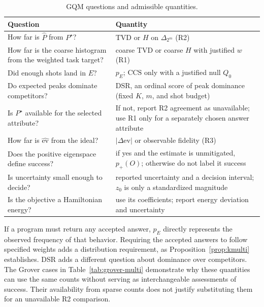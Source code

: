 \documentclass[10pt,conference]{IEEEtran}
\newcommand{\CCS}{\mathrm{CCS}}
\begin{document}
\begin{table}[ht]
\centering
\caption{GQM questions and admissible quantities.}
\label{tab:gqm}
\renewcommand{\arraystretch}{1.12}
\begin{tabularx}{\columnwidth}{@{}>{\raggedright\arraybackslash}X
>{\raggedright\arraybackslash}X@{}}
\toprule
\textbf{Question} & \textbf{Quantity} \\
\midrule
How far is $\hat{P}$ from $P^{\star}$? & TVD or $H$ on $\Delta_{2^{m}}$ (R2) \\
How far is the coarse histogram from the weighted task target? & coarse TVD or coarse $H$ with justified $w$ (R1) \\
Did enough shots land in $E$? & $p_{E}$; $\CCS$ only with a justified null $Q_0$ \\
Do expected peaks dominate competitors? & DSR, an ordinal score of peak dominance (fixed $K$, $m$, and shot budget) \\
Is $P^{\star}$ available for the selected attribute? & If not, report R2 agreement as unavailable; use R1 only for a separately chosen answer attribute \\
How far is $\widehat{\mathrm{ev}}$ from the ideal? & $\lvert\Delta\mathrm{ev}\rvert$ or observable fidelity (R3) \\
Does the positive eigenspace define success? & if yes and the estimate is unmitigated, $p_+(O)$; otherwise do not label it success \\
Is uncertainty small enough to decide? & reported uncertainty and a decision interval; $z_0$ is only a standardized magnitude \\
Is the objective a Hamiltonian energy? & use its coefficients; report energy deviation and uncertainty \\
\bottomrule
\end{tabularx}
\end{table}

If a program must return any accepted answer, $p_E$ directly represents the observed frequency of that behavior. Requiring the accepted answers to follow specified weights adds a distribution requirement, as Proposition~\ref{prop:kmulti} establishes. DSR adds a different question about dominance over competitors. The Grover cases in Table~\ref{tab:grover-multi} demonstrate why these quantities can use the same counts without serving as interchangeable assessments of success. Their availability from sparse counts does not justify substituting them for an unavailable R2 comparison.
\end{document}
